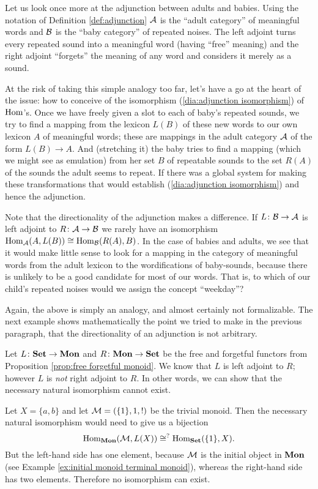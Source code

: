 \documentclass[CT4S-EN-RU]{subfiles}
\begin{document}
Let us look once more at the adjunction between adults and babies. Using the notation of Definition \ref{def:adjunction} $\mathcal{A}$ is the “adult category” of meaningful words and $\mathcal{B}$ is the “baby category” of repeated noises. The left adjoint turns every repeated sound into a meaningful word (having “free” meaning) and the right adjoint “forgets” the meaning of any word and considers it merely as a sound. 

At the risk of taking this simple analogy too far, let's have a go at the heart of the issue: how to conceive of the isomorphism (\ref{dia:adjunction isomorphism}) of $\textnormal{Hom}$'s. Once we have freely given a slot to each of baby's repeated sounds, we try to find a mapping from the lexicon $L(B)$ of these new words to our own lexicon $A$ of meaningful words; these are mappings in the adult category $\mathcal{A}$ of the form $L(B)\to A.$ And (stretching it) the baby tries to find a mapping (which we might see as emulation) from her set $B$ of repeatable sounds to the set $R(A)$ of the sounds the adult seems to repeat. If there was a global system for making these transformations that would establish  (\ref{dia:adjunction isomorphism}) and hence the adjunction.

Note that the directionality of the adjunction makes a difference. If $L\colon\mathcal{B}\rightarrow\mathcal{A}$ is left adjoint to $R\colon\mathcal{A}\rightarrow\mathcal{B}$ we rarely have an isomorphism $\textnormal{Hom}_\mathcal{A}(A,L(B))\cong\textnormal{Hom}_\mathcal{B}(R(A),B)$. In the case of babies and adults, we see that it would make little sense to look for a mapping in the category of meaningful words from the adult lexicon to the wordifications of baby-sounds, because there is unlikely to be a good candidate for most of our words. That is, to which of our child's repeated noises would we assign the concept “weekday”? 

Again, the above is simply an analogy, and almost certainly not formalizable. The next example shows mathematically the point we tried to make in the previous paragraph, that the directionality of an adjunction is not arbitrary.

\begin{example}\label{ex:adjunction monoids and sets}

Let $L\colon{\bf Set}\rightarrow{\bf Mon}$ and $R\colon{\bf Mon}\rightarrow{\bf Set}$ be the free and forgetful functors from Proposition \ref{prop:free forgetful monoid}. We know that $L$ is left adjoint to $R$; however $L$ is {\em not} right adjoint to $R$. In other words, we can show that the necessary natural isomorphism cannot exist.

Let $X=\{a,b\}$ and let $\mathcal{M}=(\{1\},1,!)$ be the trivial monoid. Then the necessary natural isomorphism would need to give us a bijection 
$$\textnormal{Hom}_{\bf Mon}(\mathcal{M},L(X))\cong^?\textnormal{Hom}_{\bf Set}(\{1\},X).$$ 
But the left-hand side has one element, because $\mathcal{M}$ is the initial object in ${\bf Mon}$ (see Example \ref{ex:initial monoid terminal monoid}), whereas the right-hand side has two elements. Therefore no isomorphism can exist.

\end{example}
\end{document}
